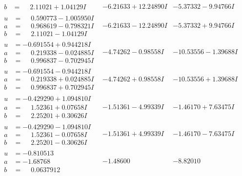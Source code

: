 \documentclass[1p]{elsarticle_modified}
\theoremstyle{definition}
\begin{document}
$$\begin{array}{c|c|c}
\begin{aligned}
b &= \phantom{-}2.11021 + 1.04129 I\end{aligned}
 & -6.21633 + 12.24890 I & -5.37332 - 9.94766 I \\ \hline\begin{aligned}
u &= \phantom{-}0.590773 - 1.005950 I \\
a &= \phantom{-}0.968619 - 0.798321 I \\
b &= \phantom{-}2.11021 - 1.04129 I\end{aligned}
 & -6.21633 - 12.24890 I & -5.37332 + 9.94766 I \\ \hline\begin{aligned}
u &= -0.691554 + 0.944218 I \\
a &= \phantom{-}0.219338 - 0.024885 I \\
b &= \phantom{-}0.996837 - 0.702945 I\end{aligned}
 & -4.74262 - 0.98558 I & -10.53556 - 1.39688 I \\ \hline\begin{aligned}
u &= -0.691554 - 0.944218 I \\
a &= \phantom{-}0.219338 + 0.024885 I \\
b &= \phantom{-}0.996837 + 0.702945 I\end{aligned}
 & -4.74262 + 0.98558 I & -10.53556 + 1.39688 I \\ \hline\begin{aligned}
u &= -0.429290 + 1.094810 I \\
a &= \phantom{-}1.52361 + 0.07658 I \\
b &= \phantom{-}2.25201 + 0.30626 I\end{aligned}
 & -1.51361 - 4.99339 I & -1.46170 + 7.63475 I \\ \hline\begin{aligned}
u &= -0.429290 - 1.094810 I \\
a &= \phantom{-}1.52361 - 0.07658 I \\
b &= \phantom{-}2.25201 - 0.30626 I\end{aligned}
 & -1.51361 + 4.99339 I & -1.46170 - 7.63475 I \\ \hline\begin{aligned}
u &= -0.810513\phantom{ +0.000000I} \\
a &= -1.68768\phantom{ +0.000000I} \\
b &= \phantom{-}0.0637912\phantom{ +0.000000I}\end{aligned}
 & -1.48600\phantom{ +0.000000I} & -8.82010\phantom{ +0.000000I} \\ \hline\begin{aligned}

\end{aligned}
\end{array}$$
\end{document}
